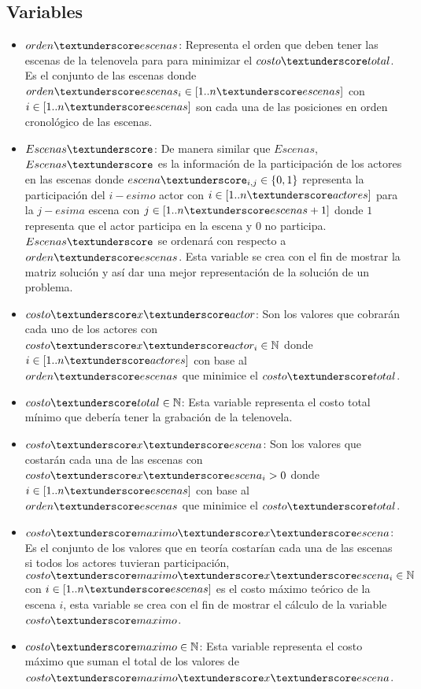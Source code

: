 \documentclass{article}
\begin{document}
\subsection{Variables}
\begin{itemize}
    \item $orden\textunderscore escenas$: Representa el orden que deben tener las escenas de la telenovela para para minimizar el $costo\textunderscore total$. Es el conjunto de las escenas donde $orden\textunderscore escenas_i \in [1..n\textunderscore escenas]$ con $i \in [1..n\textunderscore escenas]$ son cada una de las posiciones en orden cronológico de las escenas.
    \item $Escenas\textunderscore$: De manera similar que $Escenas$, $Escenas\textunderscore$ es la información de la participación de los actores en las escenas donde $escena\textunderscore_{i,j} \in \{0,1\}$ representa la participación del $i-esimo$ actor con $i \in [1..n\textunderscore actores]$ para la $j-esima$ escena con $j \in [1..n\textunderscore escenas + 1]$ donde  $1$ representa que el actor participa en la escena y $0$ no participa. $Escenas\textunderscore$ se ordenará con respecto a $orden\textunderscore escenas$. Esta variable se crea con el fin de mostrar la matriz solución y así dar una mejor representación de la solución de un problema.
    \item $costo\textunderscore x\textunderscore actor$: Son los valores que cobrarán cada uno de los actores con $costo\textunderscore x\textunderscore actor_i \in \mathbb{N}$ donde $ i \in [1..n\textunderscore actores]$ con base al $orden\textunderscore escenas$ que minimice el $costo\textunderscore total$.
    \item $costo\textunderscore total \in \mathbb{N}$: Esta variable representa el costo total mínimo que debería tener la grabación de la telenovela.
    \item $costo\textunderscore x\textunderscore escena$: Son los valores que costarán cada una de las escenas con $costo\textunderscore x\textunderscore escena_i > 0$ donde $i \in [1..n\textunderscore escenas]$ con base al $orden\textunderscore escenas$ que minimice el $costo\textunderscore total$.
    \item $costo\textunderscore maximo\textunderscore x\textunderscore escena$: Es el conjunto de los valores que en teoría costarían cada una de las escenas si todos los actores tuvieran participación, $costo\textunderscore maximo\textunderscore x\textunderscore escena_i \in \mathbb{N}$ con $i \in [1..n\textunderscore escenas]$ es el costo máximo teórico de la escena $i$, esta variable se crea con el fin de mostrar el cálculo de la variable $costo\textunderscore maximo$.
    \item $costo\textunderscore maximo \in \mathbb{N}$: Esta variable representa el costo máximo que suman el total de los valores de $costo\textunderscore maximo\textunderscore x\textunderscore escena$.
\end{itemize}
\end{document}
